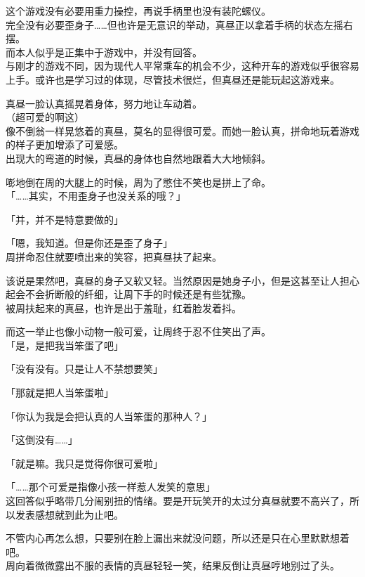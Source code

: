 这个游戏没有必要用重力操控，再说手柄里也没有装陀螺仪。\\

完全没有必要歪身子……但也许是无意识的举动，真昼正以拿着手柄的状态左摇右摆。\\

而本人似乎是正集中于游戏中，并没有回答。\\

与刚才的游戏不同，因为现代人平常乘车的机会不少，这种开车的游戏似乎很容易上手。或许也是学习过的体现，尽管技术很烂，但真昼还是能玩起这游戏来。

真昼一脸认真摇晃着身体，努力地让车动着。\\

（超可爱的啊这）\\

像不倒翁一样晃悠着的真昼，莫名的显得很可爱。而她一脸认真，拼命地玩着游戏的样子更加增添了可爱感。\\

出现大的弯道的时候，真昼的身体也自然地跟着大大地倾斜。

嘭地倒在周的大腿上的时候，周为了憋住不笑也是拼上了命。\\

「……其实，不用歪身子也没关系的哦？」

「并，并不是特意要做的」

「嗯，我知道。但是你还是歪了身子」\\

周拼命忍住就要喷出来的笑容，把真昼扶了起来。

该说是果然吧，真昼的身子又软又轻。当然原因是她身子小，但是这甚至让人担心起会不会折断般的纤细，让周下手的时候还是有些犹豫。\\

被周扶起来的真昼，也许是出于羞耻，红着脸发着抖。

而这一举止也像小动物一般可爱，让周终于忍不住笑出了声。\\

「是，是把我当笨蛋了吧」

「没有没有。只是让人不禁想要笑」

「那就是把人当笨蛋啦」

「你认为我是会把认真的人当笨蛋的那种人？」

「这倒没有……」

「就是嘛。我只是觉得你很可爱啦」

「……那个可爱是指像小孩一样惹人发笑的意思」\\

这回答似乎略带几分闹别扭的情绪。要是开玩笑开的太过分真昼就要不高兴了，所以发表感想就到此为止吧。

不管内心再怎么想，只要别在脸上漏出来就没问题，所以还是只在心里默默想着吧。\\

周向着微微露出不服的表情的真昼轻轻一笑，结果反倒让真昼哼地别过了头。\\
